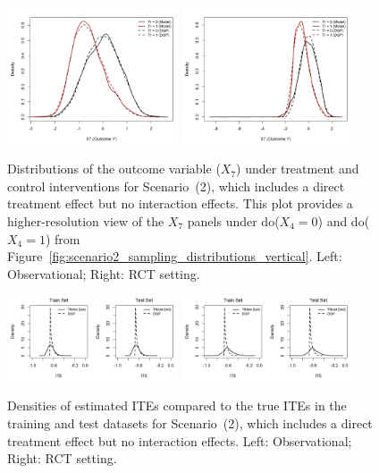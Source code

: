 \begin{figure}[htbp]
\centering
\includegraphics[width=0.45\textwidth]{img/results/observ_scenario2_X7_treatment_densities.png}
\includegraphics[width=0.45\textwidth]{img/results/rct_scenario2_X7_treatment_densities.png}
\caption{Distributions of the outcome variable ($X_7$) under treatment and control interventions for Scenario~(2), which includes a direct treatment effect but no interaction effects. This plot provides a higher-resolution view of the $X_7$ panels under do($X_4 = 0$) and do($X_4 = 1$) from Figure~\ref{fig:scenario2_sampling_distributions_vertical}. Left: Observational; Right: RCT setting.}
\label{fig:scenario2_outcome_distributions}
\end{figure}




\begin{figure}[htbp]
\centering
\includegraphics[width=0.45\textwidth]{img/results/observ_scenario2_ITE_densities_train_test.png}
\includegraphics[width=0.45\textwidth]{img/results/rct_scenario2_ITE_densities_train_test.png}
\caption{Densities of estimated ITEs compared to the true ITEs in the training and test datasets for Scenario~(2), which includes a direct treatment effect but no interaction effects. Left: Observational; Right: RCT setting.}
\label{fig:scenario2_ite_densities_train_test}
\end{figure}






